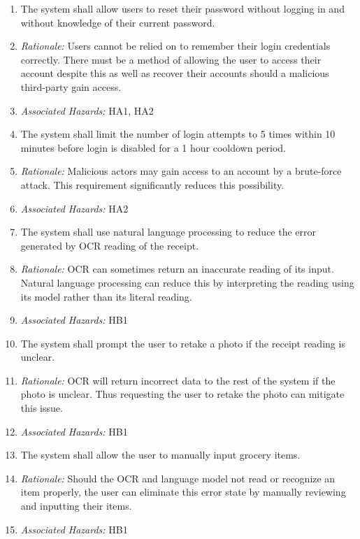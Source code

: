 \documentclass{article}
\begin{document}
\begin{enumerate}[label=SSR\arabic*.]

    \item The system shall allow users to reset their password without logging in and without knowledge of their current password.
    \item[] \emph{Rationale:} Users cannot be relied on to remember their login credentials correctly. There must be a method of allowing the user to access their account despite this as well as recover their accounts should a malicious third-party gain access.
    \item[] \emph{Associated Hazards:} HA1, HA2

    \item The system shall limit the number of login attempts to 5 times within 10 minutes before login is disabled for a 1 hour cooldown period.
    \item[] \emph{Rationale:} Malicious actors may gain access to an account by a brute-force attack. This requirement significantly reduces this possibility.
    \item[] \emph{Associated Hazards:} HA2

    \item The system shall use natural language processing to reduce the error generated by OCR reading of the receipt.
    \item[] \emph{Rationale:} OCR can sometimes return an inaccurate reading of its input. Natural language processing can reduce this by interpreting the reading using its model rather than its literal reading.
    \item[] \emph{Associated Hazards:} HB1

    \item The system shall prompt the user to retake a photo if the receipt reading is unclear.
    \item[] \emph{Rationale:} OCR will return incorrect data to the rest of the system if the photo is unclear. Thus requesting the user to retake the photo can mitigate this issue.
    \item[] \emph{Associated Hazards:} HB1

    \item The system shall allow the user to manually input grocery items.
    \item[] \emph{Rationale:} Should the OCR and language model not read or recognize an item properly, the user can eliminate this error state by manually reviewing and inputting their items.
    \item[] \emph{Associated Hazards:} HB1


\end{enumerate}
\end{document}
